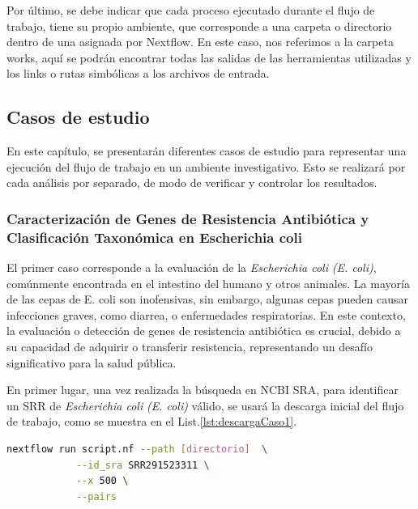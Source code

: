 \documentclass[12pt]{article}
\begin{document}
Por último, se debe indicar que cada proceso ejecutado durante el flujo de trabajo, 
tiene su propio ambiente, que corresponde a una carpeta o directorio dentro de una 
asignada por Nextflow. En este caso, nos referimos a la carpeta works, aquí se podrán 
encontrar todas las salidas de las herramientas utilizadas y los links o rutas 
simbólicas a los archivos de entrada.

\subsection{Casos de estudio}

En este capítulo, se presentarán diferentes casos de estudio para representar una 
ejecución del flujo de trabajo en un ambiente investigativo. Esto se realizará por 
cada análisis por separado, de modo de verificar y controlar los resultados.

\subsubsection*{Caracterización de Genes de Resistencia Antibiótica y Clasificación 
Taxonómica en Escherichia coli}

El primer caso corresponde a la evaluación de la 
\textit{Escherichia coli} \emph{(E. coli)}, comúnmente encontrada en el 
intestino del humano y otros animales. La mayoría de las cepas de 
E. coli son inofensivas, sin embargo, algunas cepas pueden causar 
infecciones graves, como diarrea, o enfermedades respiratorias. 
En este contexto, la evaluación o detección de genes de resistencia 
antibiótica es crucial, debido a su capacidad de adquirir o transferir 
resistencia, representando un desafío significativo para la salud 
pública.

En primer lugar, una vez realizada la búsqueda en NCBI SRA, para 
identificar un SRR de \textit{Escherichia coli} \emph{(E. coli)} 
válido, se usará la descarga inicial del flujo de trabajo, 
como se muestra en el List.\ref{lst:descargaCaso1}.

\begin{center}
    \begin{lstlisting}[language=bash, caption=Comando para la descarga inicial de las muestras de \textit{Escherichia coli} \emph{(elaboración propia)}., label=lst:descargaCaso1]
        nextflow run script.nf --path [directorio]  \
            --id_sra SRR291523311 \
            --x 500 \
            --pairs
    \end{lstlisting}
\end{center}
\end{document}
